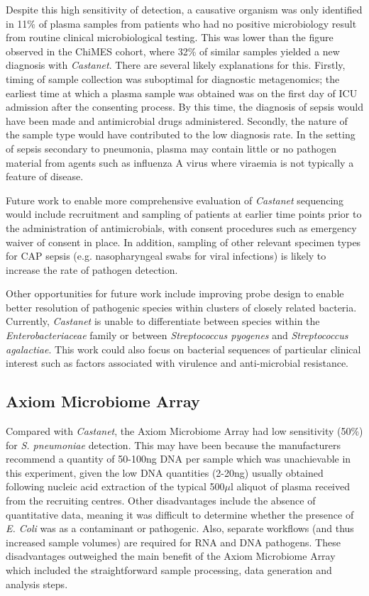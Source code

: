 Despite this high sensitivity of detection, a causative organism was only identified in 11\% of plasma samples from patients who had no positive microbiology result from routine clinical microbiological testing. This was lower than the figure observed in the ChiMES cohort, where 32\% of similar samples yielded a new diagnosis with \textit{Castanet}. There are several likely explanations for this. Firstly, timing of sample collection was suboptimal for diagnostic metagenomics; the earliest time at which a plasma sample was obtained was on the first day of ICU admission after the consenting process. By this time, the diagnosis of sepsis would have been made and antimicrobial drugs administered. Secondly, the nature of the sample type would have contributed to the low diagnosis rate. In the setting of sepsis secondary to pneumonia, plasma may contain little or no pathogen material from agents such as influenza A virus where viraemia is not typically a feature of disease.

Future work to enable more comprehensive evaluation of \textit{Castanet} sequencing would include recruitment and sampling of patients at earlier time points prior to the administration of antimicrobials, with consent procedures such as emergency waiver of consent in place. In addition, sampling of other relevant specimen types for CAP sepsis (e.g. nasopharyngeal swabs for viral infections) is likely to increase the rate of pathogen detection. 

Other opportunities for future work include improving probe design to enable better resolution of pathogenic species within clusters of closely related bacteria. Currently, \textit{Castanet} is unable to differentiate between species within the \textit{Enterobacteriaceae} family or between \textit{Streptococcus pyogenes} and \textit{Streptococcus agalactiae}. This work could also focus on bacterial sequences of particular clinical interest such as factors associated with virulence and anti-microbial resistance. 

\subsection{Axiom Microbiome Array}
Compared with \textit{Castanet}, the Axiom Microbiome Array had low sensitivity (50\%) for \textit{S. pneumoniae} detection. This may have been because the manufacturers recommend a quantity of 50-100ng DNA per sample which was unachievable in this experiment, given the low DNA quantities (2-20ng) usually obtained following  nucleic acid extraction of the typical 500$\mu$l aliquot of plasma received from the recruiting centres. Other disadvantages include the absence of quantitative data, meaning it was difficult to determine whether the presence of \textit{E. Coli} was as a contaminant or pathogenic. Also, separate workflows (and thus increased sample volumes) are required for RNA and DNA pathogens. These disadvantages outweighed the main benefit of the Axiom Microbiome Array which included the straightforward sample processing, data generation and analysis steps.

